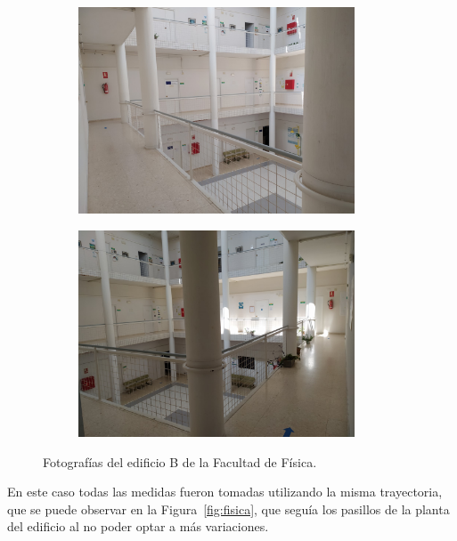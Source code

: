 \begin{figure}[H]
  \begin{subfigure}[b]{.5\textwidth}
    \centering
    \includegraphics[width=0.9\textwidth]{pic/fisica1.jpg}
    \label{fig:foto_fisica1}
  \end{subfigure}
  \begin{subfigure}[b]{.5\textwidth}
    \centering
    \includegraphics[width=0.9\textwidth]{pic/fisica2.jpg}
    \label{fig:foto_fisica2}
  \end{subfigure}
  \caption{Fotografías del edificio B de la Facultad de Física.}
  \label{fig:foto_fisica}
\end{figure}

En este caso todas las medidas fueron tomadas utilizando la misma trayectoria, que se puede observar en la Figura~\ref{fig:fisica}, que seguía los pasillos de la planta del edificio al no poder optar a más variaciones.

